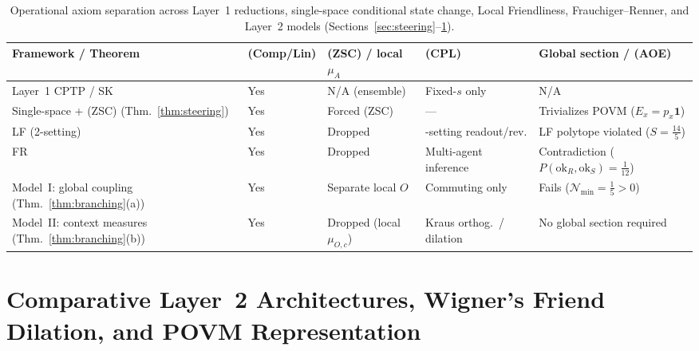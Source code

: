 \documentclass[11pt,a4paper]{article}
\theoremstyle{definition}
\theoremstyle{remark}
\newcommand{\cN}{\mathcal{N}}
\newcommand{\1}{\mathbf{1}}
\begin{document}
\begin{table}[!tb]
\centering
\caption{Operational axiom separation across Layer~1 reductions, single-space conditional state change, Local Friendliness, Frauchiger--Renner, and Layer~2 models (Sections~\ref{sec:steering}--\ref{sec:branching}).}
\label{tab:axioms}
\scriptsize
\begin{tabular}{@{} >{\raggedright\arraybackslash}p{4.2cm} >{\raggedright\arraybackslash}p{2.0cm} >{\raggedright\arraybackslash}p{2.6cm} >{\raggedright\arraybackslash}p{2.5cm} >{\raggedright\arraybackslash}p{3.2cm} @{}}
\toprule
Framework / Theorem & (Comp/Lin) & (ZSC) / local $\mu_A$ & (CPL) & Global section / (AOE) \\
\midrule
Layer~1 CPTP / SK \cite{Soga2026OSTQDSK} & Yes & N/A (ensemble) & Fixed-$s$ only & N/A \\
Single-space + (ZSC) (Thm.~\ref{thm:steering}) & Yes & Forced (ZSC) & --- & Trivializes POVM ($E_x=p_x\1$) \\
LF (2-setting) \cite{Bong2020} & Yes & Dropped & 2-setting readout/rev. & LF polytope violated ($S=\frac{14}{5}$) \\
FR \cite{FrauchigerRenner2018} & Yes & Dropped & Multi-agent inference & Contradiction ($P(\mathrm{ok}_R,\mathrm{ok}_S)=\frac{1}{12}$) \\
Model~I: global coupling (Thm.~\ref{thm:branching}(a)) & Yes & Separate local $O$ & Commuting only & Fails ($\cN_{\min}=\frac{1}{5}>0$) \\
Model~II: context measures (Thm.~\ref{thm:branching}(b)) & Yes & Dropped (local $\mu_{O,c}$) & Kraus orthog.\ / dilation & No global section required \\
\bottomrule
\end{tabular}
\end{table}

\section{Comparative Layer~2 Architectures, Wigner's Friend Dilation, and POVM Representation}\label{sec:branching}
\end{document}
